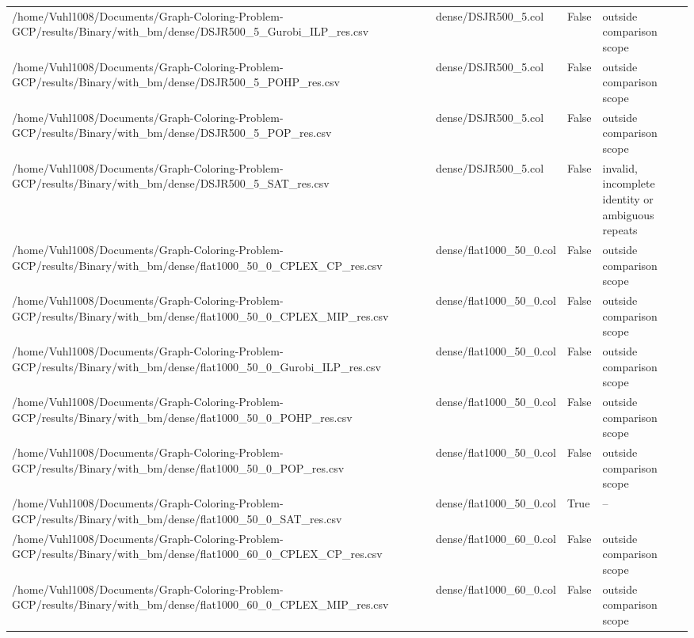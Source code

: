 \begin{table}[htbp]
\begin{tabular}{llll}
/home/Vuhl1008/Documents/Graph-Coloring-Problem-GCP/results/Binary/with\_bm/dense/DSJR500\_5\_Gurobi\_ILP\_res.csv & dense/DSJR500\_5.col & False & outside comparison scope \\
/home/Vuhl1008/Documents/Graph-Coloring-Problem-GCP/results/Binary/with\_bm/dense/DSJR500\_5\_POHP\_res.csv & dense/DSJR500\_5.col & False & outside comparison scope \\
/home/Vuhl1008/Documents/Graph-Coloring-Problem-GCP/results/Binary/with\_bm/dense/DSJR500\_5\_POP\_res.csv & dense/DSJR500\_5.col & False & outside comparison scope \\
/home/Vuhl1008/Documents/Graph-Coloring-Problem-GCP/results/Binary/with\_bm/dense/DSJR500\_5\_SAT\_res.csv & dense/DSJR500\_5.col & False & invalid, incomplete identity or ambiguous repeats \\
/home/Vuhl1008/Documents/Graph-Coloring-Problem-GCP/results/Binary/with\_bm/dense/flat1000\_50\_0\_CPLEX\_CP\_res.csv & dense/flat1000\_50\_0.col & False & outside comparison scope \\
/home/Vuhl1008/Documents/Graph-Coloring-Problem-GCP/results/Binary/with\_bm/dense/flat1000\_50\_0\_CPLEX\_MIP\_res.csv & dense/flat1000\_50\_0.col & False & outside comparison scope \\
/home/Vuhl1008/Documents/Graph-Coloring-Problem-GCP/results/Binary/with\_bm/dense/flat1000\_50\_0\_Gurobi\_ILP\_res.csv & dense/flat1000\_50\_0.col & False & outside comparison scope \\
/home/Vuhl1008/Documents/Graph-Coloring-Problem-GCP/results/Binary/with\_bm/dense/flat1000\_50\_0\_POHP\_res.csv & dense/flat1000\_50\_0.col & False & outside comparison scope \\
/home/Vuhl1008/Documents/Graph-Coloring-Problem-GCP/results/Binary/with\_bm/dense/flat1000\_50\_0\_POP\_res.csv & dense/flat1000\_50\_0.col & False & outside comparison scope \\
/home/Vuhl1008/Documents/Graph-Coloring-Problem-GCP/results/Binary/with\_bm/dense/flat1000\_50\_0\_SAT\_res.csv & dense/flat1000\_50\_0.col & True & -- \\
/home/Vuhl1008/Documents/Graph-Coloring-Problem-GCP/results/Binary/with\_bm/dense/flat1000\_60\_0\_CPLEX\_CP\_res.csv & dense/flat1000\_60\_0.col & False & outside comparison scope \\
/home/Vuhl1008/Documents/Graph-Coloring-Problem-GCP/results/Binary/with\_bm/dense/flat1000\_60\_0\_CPLEX\_MIP\_res.csv & dense/flat1000\_60\_0.col & False & outside comparison scope \\

\end{tabular}
\end{table}
